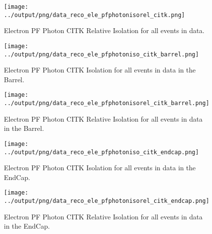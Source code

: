 \documentclass[11pt]{book}
\begin{document}
\begin{figure}[htb]
\centering
\texttt{[image: ../output/png/data\_reco\_ele\_pfphotonisorel\_citk.png]}
\caption{Electron PF Photon CITK Relative Isolation for all events in data.}
\label{fig:data_ele_pfphotonisorel_citk}
\end{figure}

\begin{figure}[htb]
\centering
\texttt{[image: ../output/png/data\_reco\_ele\_pfphotoniso\_citk\_barrel.png]}
\caption{Electron PF Photon CITK Isolation for all events in data in the Barrel.}
\label{fig:data_ele_pfphotoniso_citk_barrel}
\end{figure}

\begin{figure}[htb]
\centering
\texttt{[image: ../output/png/data\_reco\_ele\_pfphotonisorel\_citk\_barrel.png]}
\caption{Electron PF Photon CITK Relative Isolation for all events in data in the Barrel.}
\label{fig:data_ele_pfphotonisorel_citk_barrel}
\end{figure}

\begin{figure}[htb]
\centering
\texttt{[image: ../output/png/data\_reco\_ele\_pfphotoniso\_citk\_endcap.png]}
\caption{Electron PF Photon CITK Isolation for all events in data in the EndCap.}
\label{fig:data_ele_pfphotoniso_citk_endcap}
\end{figure}

\begin{figure}[htb]
\centering
\texttt{[image: ../output/png/data\_reco\_ele\_pfphotonisorel\_citk\_endcap.png]}
\caption{Electron PF Photon CITK Relative Isolation for all events in data in the EndCap.}
\label{fig:data_ele_pfphotonisorel_citk_endcap}
\end{figure}
\clearpage
\end{document}
